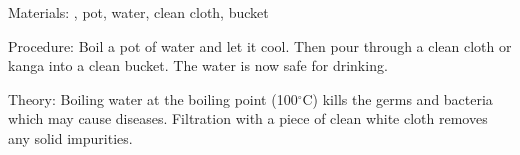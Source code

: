 \begin{multicols}{2}

\begin{description*}
\item[Materials:]{, pot, water, clean cloth, bucket}
\item[Procedure:]{Boil a pot of water and let it cool. Then pour through a clean cloth or kanga into a clean bucket. The water is now safe for drinking.}
\item[Theory:]{Boiling water at the boiling point (100$^\circ$C) kills the germs and
bacteria which may cause diseases. Filtration with a piece of clean white
cloth removes any solid impurities.}
\end{description*}



\end{multicols}

\pagebreak
